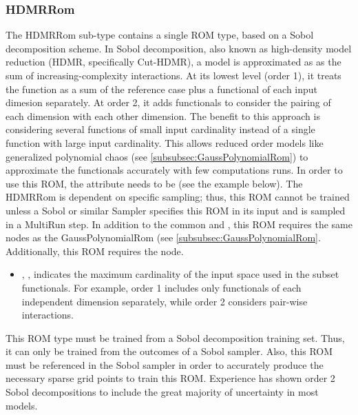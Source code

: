 \subsubsection{HDMRRom}
\label{subsubsec:HDMRRom}
The HDMRRom sub-type contains a single ROM type, based on a Sobol decomposition scheme.
%
In Sobol decomposition, also known as high-density model reduction (HDMR, specifically Cut-HDMR),
a model is approximated as as the sum of increasing-complexity interactions.  At its lowest level (order 1), it treats the function as a sum of the reference case plus a functional of each input dimesion separately.  At order 2, it adds functionals to consider the pairing of each dimension with each other dimension.  The benefit to this approach is considering several functions of small input cardinality instead of a single function with large input cardinality.  This allows reduced order models like generalized polynomial chaos (see \ref{subsubsec:GaussPolynomialRom}) to approximate the functionals accurately with few computations runs.
%
In order to use this ROM, the  attribute  needs to
be  (see the example below).
%
The HDMRRom is dependent on specific sampling; thus, this ROM cannot be trained unless a
Sobol or similar Sampler specifies this ROM in its input and is sampled in a MultiRun step.
%
In addition to the common  and , this ROM requires
the same nodes as the GaussPolynomialRom (see \ref{subsubsec:GaussPolynomialRom}.
Additionally, this ROM requires the  node.
\begin{itemize}
  \item {}, ,
  indicates the maximum cardinality of the input space used in the subset functionals.  For example, order 1
  includes only functionals of each independent dimension separately, while order 2 considers pair-wise
  interactions.
\end{itemize}
\nb This ROM type must be trained from a Sobol decomposition training set.
%
Thus, it can only be trained from the outcomes of a Sobol sampler.
Also, this ROM must be referenced in the Sobol sampler in order to
accurately produce the necessary sparse grid points to train this ROM.
Experience has shown order 2 Sobol decompositions to include the great majority of
  uncertainty in most models.


